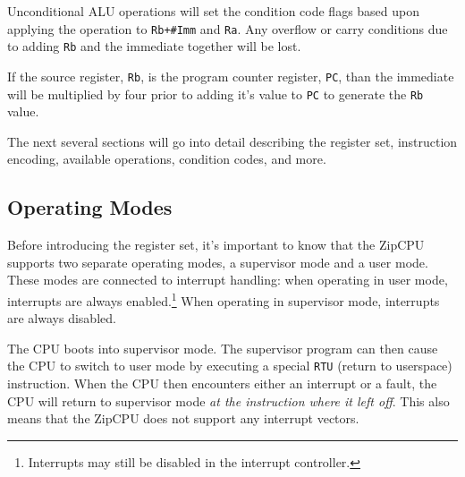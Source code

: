 \documentclass{gqtekspec}
\begin{document}
Unconditional ALU operations will set the condition code flags based upon
applying the operation to {\tt Rb+\#Imm} and {\tt Ra}.  Any overflow or
carry conditions due to adding {\tt Rb} and the immediate together will be
lost.

If the source register, {\tt Rb}, is the program counter register, {\tt PC},
than the immediate will be multiplied by four prior to adding it's value to
{\tt PC} to generate the {\tt Rb} value.

The next several sections will go into detail describing the register
set, instruction encoding, available operations, condition codes, and more.

\subsection{Operating Modes}
Before introducing the register set, it's important to know that
the ZipCPU supports two separate operating modes, a supervisor mode and a user
mode.  These modes are connected to interrupt handling: when operating in user
mode, interrupts are always enabled.\footnote{Interrupts may still be disabled
in the interrupt controller.}  When operating in supervisor mode,
interrupts are always disabled.

The CPU boots into supervisor mode.  The supervisor program can then cause
the CPU to switch to user mode by executing a special {\tt RTU} (return to
userspace) instruction.  When the CPU then encounters either an interrupt or
a fault, the CPU will return to supervisor mode {\em at the instruction where
it left off}.  This also means that the ZipCPU does not support any
interrupt vectors.
\end{document}
